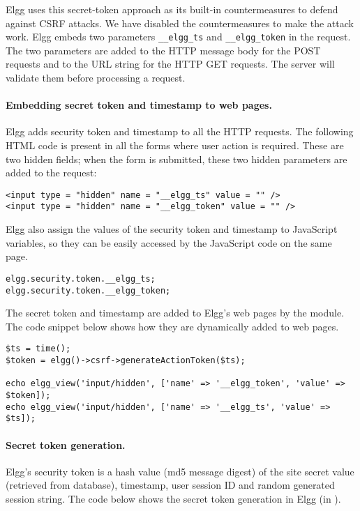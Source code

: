 Elgg uses this secret-token approach as its 
built-in countermeasures to defend against CSRF attacks. 
We have disabled the countermeasures to make the attack work. 
Elgg embeds two parameters
{\tt\_\_elgg\_ts} and {\tt\_\_elgg\_token} in the request.
The two parameters are added to the HTTP message body for the POST requests and to the URL
string for the HTTP GET requests. The server will validate them
before processing a request. 


\paragraph{Embedding secret token and timestamp to web pages.}
Elgg adds security token and timestamp to all the HTTP requests. 
The following HTML code is present in all the forms where user action is required. 
These are two hidden fields; when the form is submitted, these
two hidden parameters are added to the request:

\begin{lstlisting}
<input type = "hidden" name = "__elgg_ts" value = "" />
<input type = "hidden" name = "__elgg_token" value = "" />
\end{lstlisting}

Elgg also assign the values of the security token and timestamp to JavaScript variables, 
so they can be easily accessed by the JavaScript code on the same page.

\begin{lstlisting}
elgg.security.token.__elgg_ts;
elgg.security.token.__elgg_token;
\end{lstlisting}


The secret token and timestamp are added to Elgg's web pages by the 
module. The code snippet below shows how they are dynamically 
added to web pages.

\begin{lstlisting}
$ts = time();
$token = elgg()->csrf->generateActionToken($ts);

echo elgg_view('input/hidden', ['name' => '__elgg_token', 'value' => $token]);
echo elgg_view('input/hidden', ['name' => '__elgg_ts', 'value' => $ts]);
\end{lstlisting}


\paragraph{Secret token generation.}
Elgg's security token is a hash value (md5 message digest) of the site 
secret value (retrieved from database),
timestamp, user session ID and random generated session string. 
The code below shows the secret token generation in Elgg 
(in ).


